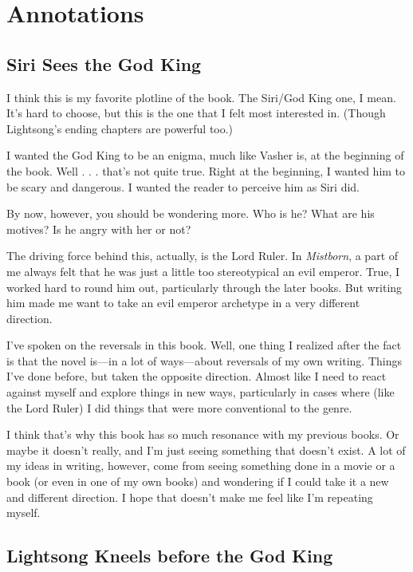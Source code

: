 \section*{Annotations}

\subsection*{Siri Sees the God King}

I think this is my favorite plotline of the book. The Siri/God King one, I mean. It’s hard to choose, but this is the one that I felt most interested in. (Though Lightsong’s ending chapters are powerful too.)

I wanted the God King to be an enigma, much like Vasher is, at the beginning of the book. Well . . . that’s not quite true. Right at the beginning, I wanted him to be scary and dangerous. I wanted the reader to perceive him as Siri did.

By now, however, you should be wondering more. Who is he? What are his motives? Is he angry with her or not?

The driving force behind this, actually, is the Lord Ruler. In \textit{Mistborn}, a part of me always felt that he was just a little too stereotypical an evil emperor. True, I worked hard to round him out, particularly through the later books. But writing him made me want to take an evil emperor archetype in a very different direction.

I’ve spoken on the reversals in this book. Well, one thing I realized after the fact is that the novel is—in a lot of ways—about reversals of my own writing. Things I’ve done before, but taken the opposite direction. Almost like I need to react against myself and explore things in new ways, particularly in cases where (like the Lord Ruler) I did things that were more conventional to the genre.

I think that’s why this book has so much resonance with my previous books. Or maybe it doesn’t really, and I’m just seeing something that doesn’t exist. A lot of my ideas in writing, however, come from seeing something done in a movie or a book (or even in one of my own books) and wondering if I could take it a new and different direction. I hope that doesn’t make me feel like I’m repeating myself.

\subsection*{Lightsong Kneels before the God King}


